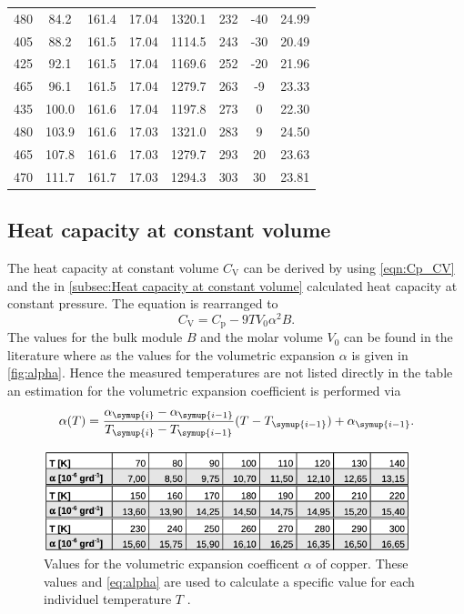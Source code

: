 \begin{table}
\begin{tabular}{S S S S | S S S | S}
    480 &  84.2 &  161.4  & 17.04 & 1320.1 & 232 & -40  & 24.99 \\
    405 &  88.2 &  161.5  & 17.04 & 1114.5 & 243 & -30  & 20.49 \\
    425 &  92.1 &  161.5  & 17.04 & 1169.6 & 252 & -20  & 21.96 \\
    465 &  96.1 &  161.5  & 17.04 & 1279.7 & 263 & -9   & 23.33 \\
    435 & 100.0 &  161.6  & 17.04 & 1197.8 & 273 & 0    & 22.30 \\
    480 & 103.9 &  161.6  & 17.03 & 1321.0 & 283 & 9    & 24.50 \\
    465 & 107.8 &  161.6  & 17.03 & 1279.7 & 293 & 20   & 23.63 \\
    470 & 111.7 &  161.7  & 17.03 & 1294.3 & 303 & 30   & 23.81 \\
    \bottomrule
  \end{tabular}
\end{table}

\subsection{Heat capacity at constant volume}
The heat capacity at constant volume $C_\mathrm{V}$ can be derived by using \autoref{eqn:Cp_CV} and the in \autoref{subsec:Heat capacity at constant volume}
calculated heat capacity at constant pressure. The equation is rearranged to
\begin{equation*}
  C_\mathrm{V} = C_\mathrm{p} - 9 T V_0 \alpha^2 B.
\end{equation*}
The values for the bulk module $B$ and the molar volume $V_0$ can be found in the literature where as the values for the volumetric expansion $\alpha$ is given
in \autoref{fig:alpha}. Hence the measured temperatures are not listed directly in the table an estimation for the volumetric expansion coefficient is performed
via
\begin{equation}
  \alpha (T) = \frac{\alpha_{\symup{i}}-\alpha_{\symup{i-1}}} {T_{\symup{i}}-T_{\symup{i-1}}} (T-T_{\symup{i-1}}) + \alpha_{\symup{i-1}}.
  \label{eq:alpha}
\end{equation}

\begin{figure}
  \centering
  \includegraphics[width = 0.95\textwidth]{content/pics/alpha.png}
  \caption{Values for the volumetric expansion coefficent $\alpha$ of copper. These values and \autoref{eq:alpha} are used to calculate a specific %
  value for each individuel temperature $T$ \cite{V47}.}
  \label{fig:alpha}
\end{figure}

